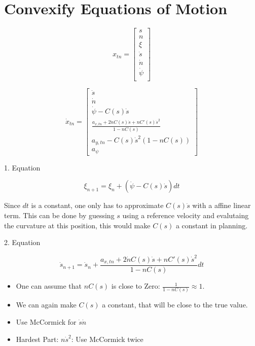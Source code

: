 \chapter{Convexify Equations of Motion}

\[
	x_{tn} = \begin{bmatrix}
		s          \\
		n          \\
		\xi        \\
		\dot{s}    \\
		\dot{n}    \\
		\dot{\psi} \\
	\end{bmatrix}
\]

\[
	\dot{x}_{tn} = \begin{bmatrix}
		\dot{s}                                    \\
		\dot{n}                                    \\
		\dot{\psi} - C(s)\dot{s}                   \\
		\frac{
			a_{x, tn} + 2\dot{n}
		C(s)\dot{s} + nC'(s)\dot{s}^2 }{ 1-nC(s) } \\ a_{y,tn}-C(s)\dot{s}^2(1-nC(s)) \\ a_{\psi}\end{bmatrix} \]

1.
Equation

\[ \xi_{n+1} = \xi_n + (\dot{\psi} - C(s)\dot{s}) dt \]

Since $dt$ is a constant, one only has to
approximate $C(s)\dot{s}$ with a affine linear term.
This can be done by guessing $s$ using a reference velocity and evalutaing the curvature at this position, this would make $C(s)$ a constant in
planning.

2.
Equation

\[ \dot{s}_{n+1} = \dot{s}_n + \frac{ a_{x, tn} + 2\dot{n} C(s)\dot{s} + nC'(s)\dot{s}^2 }{ 1-nC(s) } dt \]

\begin{itemize}
	\item One can assume that $nC(s)$ is close to Zero: $\frac{1}{1-nC(s)}\approx1$.
	\item We can again make $C(s)$ a constant, that will be close to the true value.
	\item Use McCormick for $\dot{s}\dot{n}$
	\item Hardest Part: $n\dot{s}^2$: Use McCormick twice
\end{itemize}

